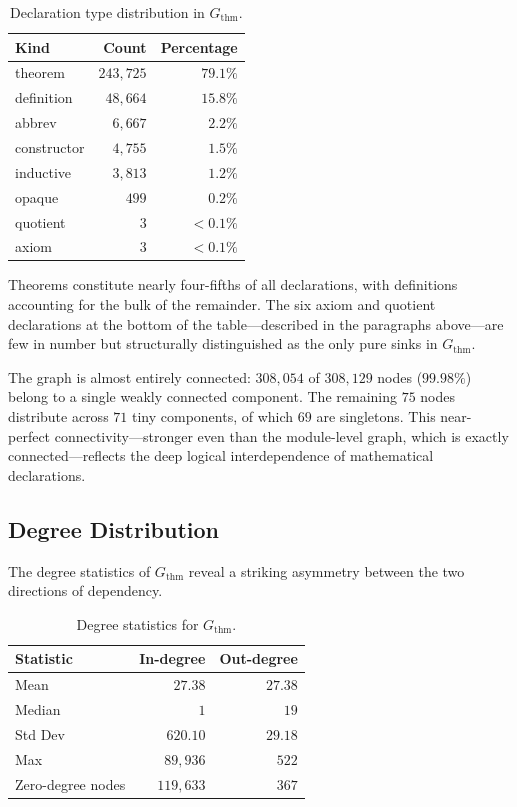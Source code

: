 \begin{table}[ht]
\centering
\caption{Declaration type distribution in $G_{\mathrm{thm}}$.}
\label{tab:thm-kinds}
\begin{tabular}{lrr}
\toprule
Kind & Count & Percentage \\
\midrule
theorem     & $243{,}725$ & $79.1\%$ \\
definition  & $48{,}664$  & $15.8\%$ \\
abbrev      & $6{,}667$   & $2.2\%$ \\
constructor & $4{,}755$   & $1.5\%$ \\
inductive   & $3{,}813$   & $1.2\%$ \\
opaque      & $499$       & $0.2\%$ \\
quotient    & $3$         & ${<}0.1\%$ \\
axiom       & $3$         & ${<}0.1\%$ \\
\bottomrule
\end{tabular}
\end{table}

Theorems constitute nearly four-fifths of all declarations, with definitions accounting for the bulk of the remainder. The six axiom and quotient declarations at the bottom of the table---described in the paragraphs above---are few in number but structurally distinguished as the only pure sinks in $G_{\mathrm{thm}}$.

The graph is almost entirely connected: $308{,}054$ of $308{,}129$ nodes ($99.98\%$) belong to a single weakly connected component. The remaining $75$ nodes distribute across $71$ tiny components, of which $69$ are singletons. This near-perfect connectivity---stronger even than the module-level graph, which is exactly connected---reflects the deep logical interdependence of mathematical declarations.

\subsection{Degree Distribution}
\label{sec:thm-degree}

The degree statistics of $G_{\mathrm{thm}}$ reveal a striking asymmetry between the two directions of dependency.

\begin{table}[ht]
\centering
\caption{Degree statistics for $G_{\mathrm{thm}}$.}
\label{tab:thm-degree}
\begin{tabular}{lrr}
\toprule
Statistic & In-degree & Out-degree \\
\midrule
Mean    & $27.38$    & $27.38$ \\
Median  & $1$        & $19$ \\
Std Dev & $620.10$   & $29.18$ \\
Max     & $89{,}936$ & $522$ \\
Zero-degree nodes & $119{,}633$ & $367$ \\
\bottomrule
\end{tabular}
\end{table}


